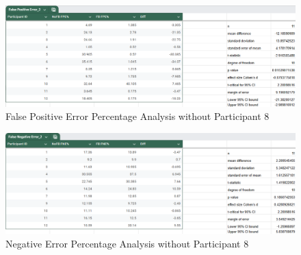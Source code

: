 \documentclass{l4proj}
\begin{document}
\begin{appendices}
\begin{figure}[!h]
    \centering
    \includegraphics[width=1\linewidth]{images//CSFYP data analysis/False Positive Error Pecentage Analysis without Participant 8.png}
    \caption{False Positive Error Percentage Analysis without Participant 8}
    \label{fig:FPappendixno8}
\end{figure}

\begin{figure}[!h]
    \centering
    \includegraphics[width=1\linewidth]{images//CSFYP data analysis/False Negative Error Pecentage Analysis without Participant 8.png}
    \caption{Negative Error Percentage Analysis without Participant 8}
    \label{fig:FNappendixno8}
\end{figure}




\end{appendices}





\renewcommand{\thechapter}{0} 

\end{document}
